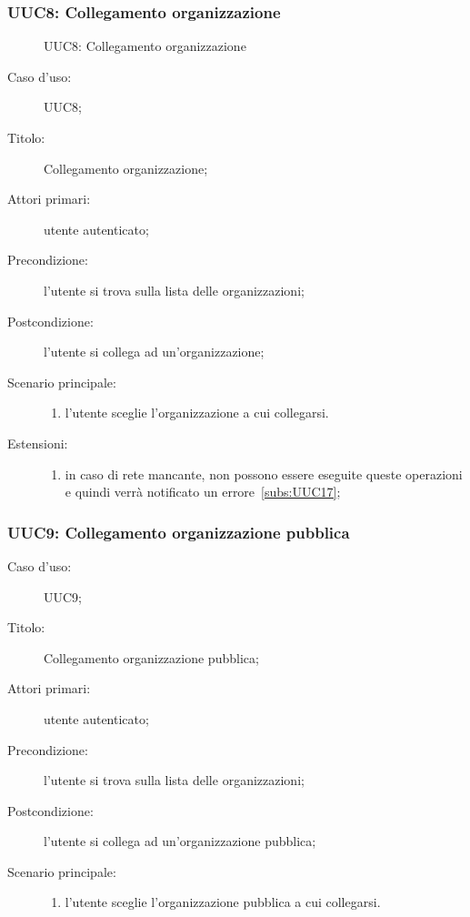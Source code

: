 \documentclass[../../../analisi-dei-requisiti.tex]{subfiles}
\begin{document}
\subsubsection{UUC8: Collegamento organizzazione}%
\label{subs:UUC8}

\begin{figure}[H]
  \centering
  \caption{UUC8: Collegamento organizzazione}%
  \label{fig:UUC8}
\end{figure}



\begin{description}
  \item[Caso d'uso:] UUC8;
  \item[Titolo:] Collegamento organizzazione;
  \item[Attori primari:] utente autenticato;
  \item[Precondizione:] l'utente si trova sulla lista delle organizzazioni;
  \item[Postcondizione:] l'utente si collega ad un'organizzazione;
  \item[Scenario principale:]
        \begin{enumerate}
          \item l'utente sceglie l'organizzazione a cui collegarsi.
        \end{enumerate}
  \item[Estensioni:]
        \begin{enumerate}
          \item in caso di rete mancante, non possono essere eseguite queste operazioni e quindi verrà notificato un errore~\ref{subs:UUC17};
        \end{enumerate}
\end{description}

\subsubsection{UUC9: Collegamento organizzazione pubblica}%
\label{subs:UUC9}

\begin{description}
  \item[Caso d'uso:] UUC9;
  \item[Titolo:] Collegamento organizzazione pubblica;
  \item[Attori primari:] utente autenticato;
  \item[Precondizione:] l'utente si trova sulla lista delle organizzazioni;
  \item[Postcondizione:] l'utente si collega ad un'organizzazione pubblica;
  \item[Scenario principale:]
        \begin{enumerate}
          \item l'utente sceglie l'organizzazione pubblica a cui collegarsi.
        \end{enumerate}
\end{description}
\end{document}
